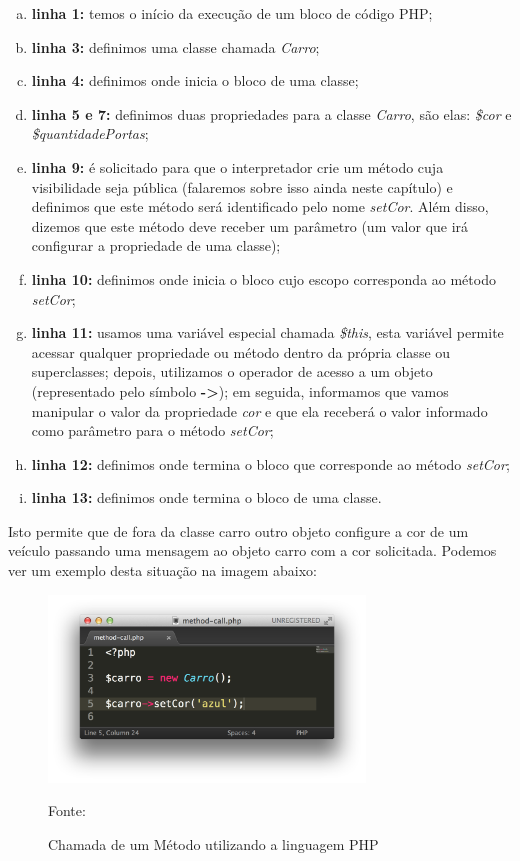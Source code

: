 \begin{enumerate}[a)]
    \item \textbf{linha 1:} temos o início da execução de um bloco de código PHP;
    \item \textbf{linha 3:} definimos uma classe chamada \textit{Carro};
    \item \textbf{linha 4:} definimos onde inicia o bloco de uma classe;
    \item \textbf{linha 5 e 7:} definimos duas propriedades para a classe
    \textit{Carro}, são elas: \textit{\$cor} e \textit{\$quantidadePortas};
    \item \textbf{linha 9:} é solicitado para que o interpretador crie um método
    cuja visibilidade seja pública (falaremos sobre isso ainda neste capítulo) 
    e definimos que este método será identificado pelo nome \textit{setCor}.
    Além disso, dizemos que este método deve receber um parâmetro (um valor 
    que  irá configurar a propriedade de uma classe);
    \item \textbf{linha 10:} definimos onde inicia o bloco cujo escopo
    corresponda ao método \textit{setCor};
    \item \textbf{linha 11:} usamos uma variável especial chamada
    \textit{\$this}, esta variável permite acessar qualquer propriedade ou
    método dentro da própria classe ou superclasses; depois, utilizamos o 
    operador de acesso a um objeto (representado pelo símbolo \textbf{->}); em
    seguida, informamos que vamos manipular o valor da propriedade \textit{cor}
    e que ela receberá o valor informado como parâmetro para o método \textit{setCor};
    \item \textbf{linha 12:} definimos onde termina o bloco que corresponde ao
    método \textit{setCor};
    \item \textbf{linha 13:} definimos onde termina o bloco de uma classe.
\end{enumerate}
				
Isto permite que de fora da classe carro outro objeto configure a cor de um
veículo passando uma mensagem ao objeto carro com a cor solicitada. Podemos ver 
um exemplo desta situação na imagem abaixo:


\begin{figure}[h!tb]
	\label{fig:chamadaMetodo}
	
	\centering
	\caption{Chamada de um Método utilizando a linguagem PHP}
	
	\centering
	\includegraphics[width=0.75\textwidth]{images/method-call.png}
	
	\centering
	\footnotesize Fonte: \fonteOAutor
\end{figure}

